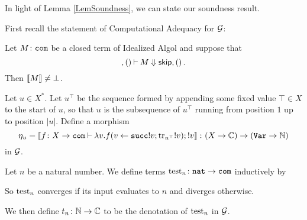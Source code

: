 \documentclass{article}
\begin{document}
In light of Lemma \ref{LemSoundness}, we can state our soundness result.

First recall the statement of Computational Adequacy for $\mathcal G$:

\begin{proposition}
  Let $M\colon {\mathtt{com}}$ be a closed term of Idealized Algol and suppose that
  \[
    ,()\mathbin{\vdash} M\Downarrow {\mathsf{skip}},()\,.
    \]
  Then $\left\llbracket M\right\rrbracket \ne \bot$.
\end{proposition}

\begin{definition}
  Let $u\in X^*$.
  Let $u^\top$ be the sequence formed by appending some fixed value $\top\in X$ to the start of $u$, so that $u$ is the subsequence of $u^\top$ running from position $1$ up to position $|u|$.
  Define a morphism
  \[
    \eta_u = \left\llbracket f\colon X \to {\mathtt{com}} \mathbin{\vdash} \lambda v.f(v\gets \operatorname{{\mathtt{succ}}} !v;\operatorname{tr}_{u^\top} !v);!v\right\rrbracket \colon (X \to \mathbb{C}) \to ({\mathtt{Var}} \to \mathbb{N})
    \]
  in $\mathcal G$.
\end{definition}

\begin{definition}
  Let $n$ be a natural number.  
  We define terms $\operatorname{test}_n\colon {\mathtt{nat}} \to {\mathtt{com}}$ inductively by
  So $\operatorname{test}_n$ converges if its input evaluates to $n$ and diverges otherwise.

  We then define $t_n\colon \mathbb{N} \to \mathbb{C}$ to be the denotation of $\operatorname{test}_n$ in $\mathcal G$.
\end{definition}
\end{document}
